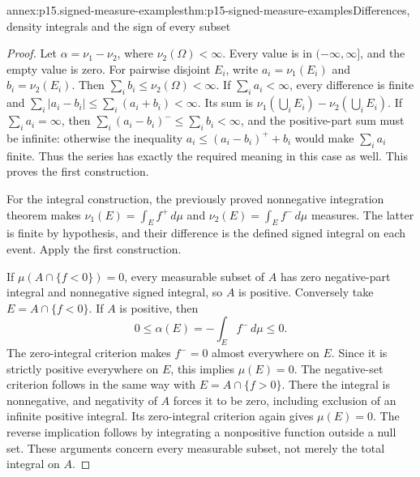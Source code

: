 
\begin{annexitem}{annex:p15.signed-measure-examples}{thm:p15-signed-measure-examples}{Differences, density integrals and the sign of every subset}
\begin{proof}
Let \(\alpha=\nu_1-\nu_2\), where \(\nu_2(\Omega)<\infty\).
Every value is in \((-\infty,\infty]\), and the empty value is zero.
For pairwise disjoint \(E_i\), write \(a_i=\nu_1(E_i)\) and
\(b_i=\nu_2(E_i)\). Then \(\sum_i b_i\leq\nu_2(\Omega)<\infty\).
If \(\sum_i a_i<\infty\), every difference is finite and
\(\sum_i|a_i-b_i|\leq\sum_i(a_i+b_i)<\infty\).
Its sum is \(\nu_1(\bigcup_iE_i)-\nu_2(\bigcup_iE_i)\).
If \(\sum_i a_i=\infty\), then
\(\sum_i(a_i-b_i)^-\leq\sum_i b_i<\infty\), and the positive-part
sum must be infinite: otherwise the inequality
\(a_i\leq(a_i-b_i)^++b_i\) would make \(\sum_i a_i\) finite.
Thus the series has exactly the required meaning in this case as well.
This proves the first construction.

For the integral construction, the previously proved nonnegative
integration theorem makes
\(\nu_1(E)=\int_E f^+\,d\mu\) and
\(\nu_2(E)=\int_E f^-\,d\mu\) measures.
The latter is finite by hypothesis, and their difference is the defined
signed integral on each event. Apply the first construction.

If \(\mu(A\cap\{f<0\})=0\), every measurable subset of \(A\) has
zero negative-part integral and nonnegative signed integral, so \(A\)
is positive. Conversely take \(E=A\cap\{f<0\}\).
If \(A\) is positive, then
\[
                     0\leq\alpha(E)=-\int_E f^-\,d\mu\leq0.
\]
The zero-integral criterion makes \(f^-=0\) almost everywhere on \(E\).
Since it is strictly positive everywhere on \(E\), this implies
\(\mu(E)=0\).
The negative-set criterion follows in the same way with
\(E=A\cap\{f>0\}\). There the integral is nonnegative, and negativity
of \(A\) forces it to be zero, including exclusion of an infinite
positive integral. Its zero-integral criterion again gives \(\mu(E)=0\).
The reverse implication follows by integrating a nonpositive function
outside a null set. These arguments concern every measurable subset,
not merely the total integral on \(A\).
\end{proof}
\end{annexitem}

